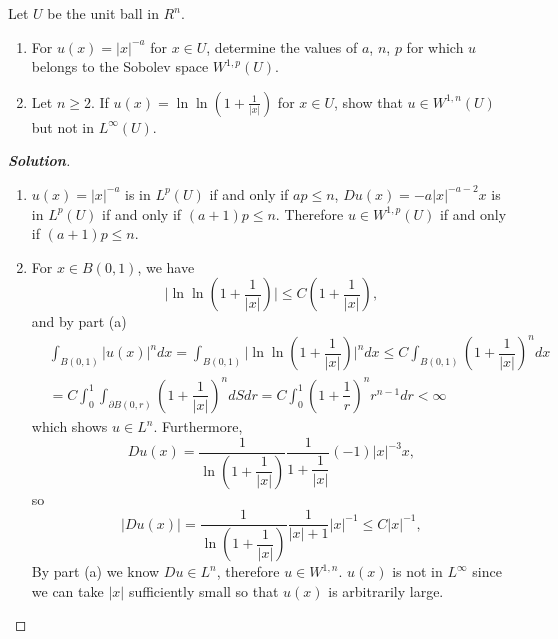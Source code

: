 \documentclass[11pt,reqno]{amsart}
\newcommand{\<}{\langle}
\renewcommand{\>}{\rangle}
\newcommand{\norm}[1]{\vert#1\vert}
\begin{document}
\begin{enumerate}[label={\arabic*.}]
\newpage
\begin{tcolorbox}
\item Let $U$ be the unit ball in $R^n$.
\begin{enumerate}[leftmargin=*]
\item For $u(x) = \norm{x}^{-a}$ for $x\in U$, determine the values of $a$, $n$, $p$ for which $u$ belongs to the Sobolev space $W^{1,p}(U)$.
\item Let $n\geq 2$. If $u(x) = \ln \ln (1+\frac{1}{\norm{x}})$ for $x\in U$, show that $u\in W^{1,n}(U)$ but not in $L^{\infty}(U)$.
\end{enumerate}
\end{tcolorbox}
\bigskip


\begin{proof}[\bf{Solution}]
\leavevmode
\begin{enumerate}
\item  $u(x) = \norm{x}^{-a}$ is in  $L^p(U)$ if and only if $ap\leq n$, $Du(x) = -a \norm{x}^{-a-2}x$ is in $L^p(U)$ if and only if $(a+1)p \leq n$. Therefore $u \in W^{1,p}(U)$ if and only if $(a+1)p \leq n$.
\item For $x \in B(0,1)$, we have
\begin{equation*}
\norm{\ln \ln (1+\dfrac{1}{\norm{x}})} \leq C (1+\dfrac{1}{\norm{x}}),
\end{equation*}
and by part (a)
\begin{align*}
&
\int_{B(0,1)} \norm{u(x)}^n dx = \int_{B(0,1)} \norm{\ln \ln(1+\dfrac{1}{\norm{x}})}^n dx
\leq
C\int_{B(0,1)} (1+\dfrac{1}{\norm{x}})^n dx \\
&=
C\int_0^1 \int_{\partial B(0,r)} (1+\dfrac{1}{\norm{x}})^n dS dr
=C \int_0^1 (1+\dfrac{1}{r})^n r^{n-1} dr < \infty
\end{align*}
which shows $u\in L^n$.
Furthermore,
\begin{equation*}
Du(x) = \dfrac{1}{\ln (1+\dfrac{1}{\norm{x}})} \dfrac{1}{1+\dfrac{1}{\norm{x}}}(-1) \norm{x}^{-3} x,
\end{equation*}
so
\begin{equation*}
\norm{Du(x)} = \dfrac{1}{\ln (1+\dfrac{1}{\norm{x}})} \dfrac{1}{\norm{x}+1}  \norm{x}^{-1} \leq C \norm{x}^{-1},
\end{equation*}
By part (a) we know $Du \in L^n$, therefore $u \in W^{1,n}$. $u(x)$ is not in $L^\infty$ since we can take $\norm{x}$ sufficiently small so that $u(x)$ is arbitrarily large.
\end{enumerate}
\end{proof}






\end{enumerate}
\end{document}
